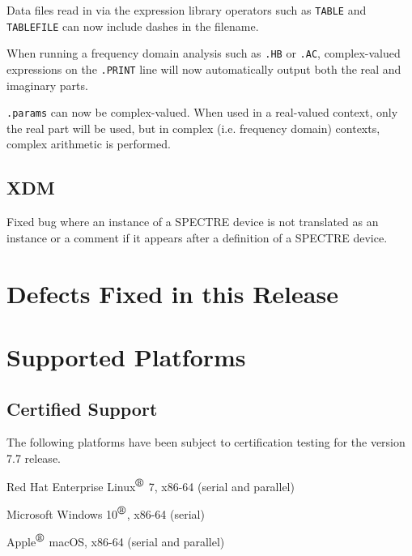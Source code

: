 \documentclass[letterpaper]{scrartcl}
\begin{document}
\begin{XyceItemize}
\item Data files read in via the expression library operators such as
     \texttt{TABLE} and \texttt{TABLEFILE} can now include dashes in the
     filename.

\item When running a frequency domain analysis such as \texttt{.HB} or
     \texttt{.AC}, complex-valued expressions on the \texttt{.PRINT} line will
     now automatically output both the real and imaginary parts.

\item \texttt{.params} can now be complex-valued.  When used in a real-valued
     context, only the real part will be used, but in complex (i.e. frequency
     domain) contexts, complex arithmetic is performed.

\end{XyceItemize}


\subsection*{XDM}
\begin{XyceItemize}
\item Fixed bug where an instance of a SPECTRE device is not translated as an
    instance or a comment if it appears after a definition of a SPECTRE device.
\end{XyceItemize}


\newpage
\section{Defects Fixed in this Release}


\newpage
\section{Supported Platforms}
\subsection*{Certified Support}
The following platforms have been subject to certification testing for the
\Xyce{} version 7.7 release.
\begin{XyceItemize}
  \item Red Hat Enterprise Linux${}^{\mbox{\textregistered}}$ 7, x86-64 (serial and parallel)
  \item Microsoft Windows 10${}^{\mbox{\textregistered}}$, x86-64 (serial)
  \item Apple${}^{\mbox{\textregistered}}$ macOS, x86-64 (serial and parallel)
\end{XyceItemize}
\end{document}
